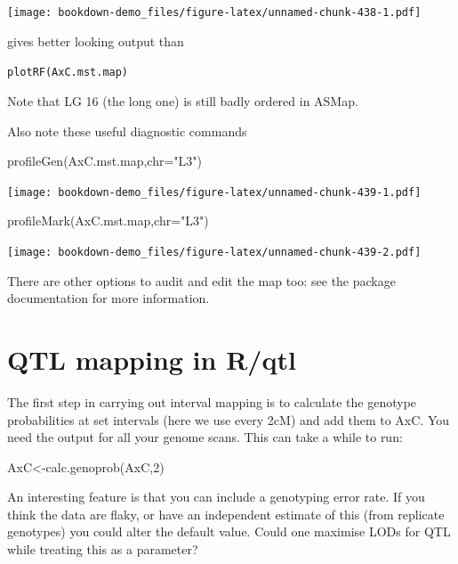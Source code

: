 \documentclass[
]{book}
\newenvironment{Shaded}{\begin{snugshade}}{\end{snugshade}}
\newcommand{\AttributeTok}[1]{\textcolor[rgb]{0.77,0.63,0.00}{#1}}
\newcommand{\DecValTok}[1]{\textcolor[rgb]{0.00,0.00,0.81}{#1}}
\newcommand{\FunctionTok}[1]{\textcolor[rgb]{0.00,0.00,0.00}{#1}}
\newcommand{\NormalTok}[1]{#1}
\newcommand{\OtherTok}[1]{\textcolor[rgb]{0.56,0.35,0.01}{#1}}
\newcommand{\StringTok}[1]{\textcolor[rgb]{0.31,0.60,0.02}{#1}}
\begin{document}
\texttt{[image: bookdown-demo\_files/figure-latex/unnamed-chunk-438-1.pdf]}

gives better looking output than

\texttt{plotRF(AxC.mst.map)}

Note that LG 16 (the long one) is still badly ordered in ASMap.

Also note these useful diagnostic commands

\begin{Shaded}
\begin{Highlighting}[]
\FunctionTok{profileGen}\NormalTok{(AxC.mst.map,}\AttributeTok{chr=}\StringTok{"L3"}\NormalTok{) }
\end{Highlighting}
\end{Shaded}

\texttt{[image: bookdown-demo\_files/figure-latex/unnamed-chunk-439-1.pdf]}

\begin{Shaded}
\begin{Highlighting}[]
\FunctionTok{profileMark}\NormalTok{(AxC.mst.map,}\AttributeTok{chr=}\StringTok{"L3"}\NormalTok{) }
\end{Highlighting}
\end{Shaded}

\texttt{[image: bookdown-demo\_files/figure-latex/unnamed-chunk-439-2.pdf]}

There are other options to audit and edit the map too: see the package documentation for more information.

\hypertarget{qtl-mapping-in-rqtl}{%
\section{QTL mapping in R/qtl}\label{qtl-mapping-in-rqtl}}

The first step in carrying out interval mapping is to calculate the genotype probabilities at set intervals (here we use every 2cM) and add them to AxC. You need the output for all your genome scans. This can take a while to run:

\begin{Shaded}
\begin{Highlighting}[]
\NormalTok{AxC}\OtherTok{\textless{}{-}}\FunctionTok{calc.genoprob}\NormalTok{(AxC,}\DecValTok{2}\NormalTok{) }
\end{Highlighting}
\end{Shaded}

An interesting feature is that you can include a genotyping error rate. If you think the data are flaky, or have an independent estimate of this (from replicate genotypes) you could alter the default value. Could one maximise LODs for QTL while treating this as a parameter?
\end{document}

